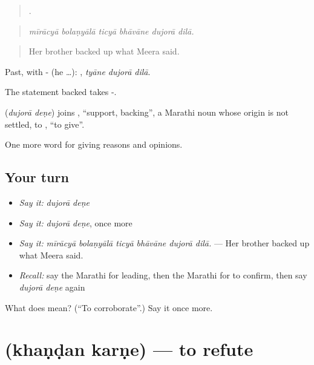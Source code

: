 \begin{quote}
     .
\end{quote}

\begin{quote}
\emph{mīrācyā bolaṇyālā ticyā bhāvāne dujorā dilā.}
\end{quote}

\begin{quote}
Her brother backed up what Meera said.
\end{quote}

Past, with - (he …):   , \emph{tyāne dujorā dilā}.

The statement backed takes -.

\begin{cousinweb}
\textbf{ } (\emph{dujorā deṇe}) joins , \textquotedblleft{}support, backing\textquotedblright{}, a Marathi noun whose origin is not settled, to , \textquotedblleft{}to give\textquotedblright{}.
\end{cousinweb}

\begin{grammarlens}[title={What you've built}]
One more word for giving reasons and opinions.
\end{grammarlens}

\subsection*{Your turn}
\begin{itemize}
\raggedright
  \item \emph{Say it:} \emph{dujorā deṇe}
  \item \emph{Say it:} \emph{dujorā deṇe}, once more
  \item \emph{Say it:} \emph{mīrācyā bolaṇyālā ticyā bhāvāne dujorā dilā.} — Her brother backed up what Meera said.
  \item \emph{Recall:} say the Marathi for leading, then the Marathi for to confirm, then say \emph{dujorā deṇe} again
\end{itemize}

\begin{tcolorbox}[breakable,colback=teal!4,colframe=teal!35!black,title={Before you move on}]
What does   mean? (\textquotedblleft{}To corroborate\textquotedblright{}.) Say it once more.
\end{tcolorbox}
\section[\texorpdfstring{\mr{खंडन} \mr{करणे} (khaṇḍan karṇe)}{खंडन करणे (khaṇḍan karṇe)}]{  (khaṇḍan karṇe) — to refute}

